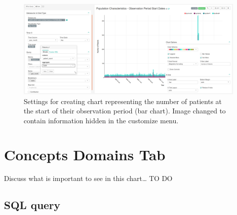 \documentclass[]{book}
\begin{document}
\begin{figure}
\includegraphics[width=1\linewidth]{images/populationCharacteristicsObservationPeriodStartDates} \caption{Settings for creating chart representing the number of patients at the start of their observation period (bar chart). Image changed to contain information hidden in the customize menu.}\label{fig:visitTypes8}
\end{figure}

\section{Concepts Domains Tab}\label{concepts-domains-tab}

Discuss what is important to see in this chart\ldots{} TO DO

\subsection{SQL query}\label{sql-query-17}
\end{document}
